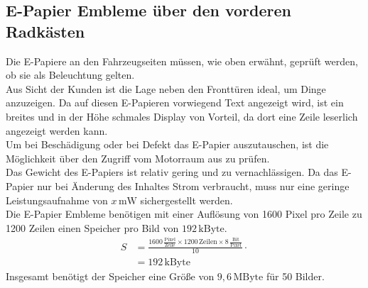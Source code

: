 \subsection{E-Papier Embleme über den vorderen Radkästen}
Die E-Papiere an den Fahrzeugseiten müssen, wie oben erwähnt, geprüft werden, ob sie als Beleuchtung gelten.\\
Aus Sicht der Kunden ist die Lage neben den Fronttüren ideal, um Dinge anzuzeigen.
Da auf diesen E-Papieren vorwiegend Text angezeigt wird, ist ein breites und in der Höhe schmales Display von Vorteil, da dort eine Zeile leserlich angezeigt werden kann. \\
Um bei Beschädigung oder bei Defekt das E-Papier auszutauschen, ist die Möglichkeit über den Zugriff vom Motorraum aus zu prüfen. \\
Das Gewicht des E-Papiers ist relativ gering und zu vernachlässigen.
Da das E-Papier nur bei Änderung des Inhaltes Strom verbraucht, muss nur eine geringe Leistungsaufnahme von $ x\,\mathrm{mW} $ sichergestellt werden. \\
Die E-Papier Embleme benötigen mit einer Auflösung von 1600 Pixel pro Zeile zu 1200 Zeilen einen Speicher pro Bild von $ 192\,\mathrm{kByte} $.
\begin{align}
	S &= \frac{1600\,\frac{\mathrm{Pixel}}{\mathrm{Zeile}} \times 1200\,\mathrm{Zeilen} \times 8\,\frac{\mathrm{Bit}}{\mathrm{Pixel}}}{10} \cdot \\
	&= 192\,\mathrm{kByte}
\end{align}
Insgesamt benötigt der Speicher eine Größe von $ 9,6\,\mathrm{MByte} $ für 50 Bilder.
